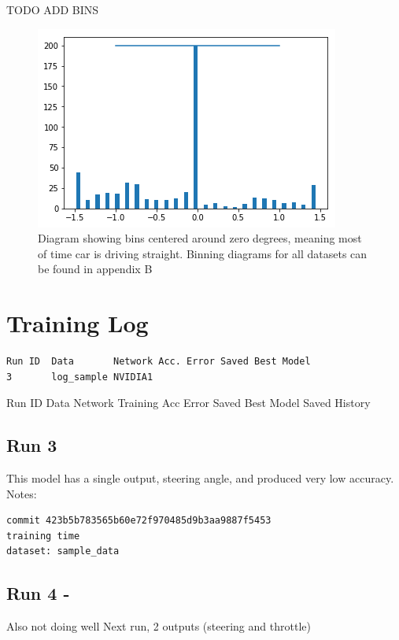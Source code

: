 TODO ADD BINS
\begin{figure}[ht]
 \centering 
 \includegraphics[scale=1]{Figures/bins.png}
 \caption{Diagram showing bins centered around zero degrees, meaning most of time car is driving straight. Binning diagrams for all datasets can be found in appendix B}
 \label{fig:bins-placeholder}
\end{figure}

\section{Training Log}

\begin{verbatim}
Run ID  Data       Network Acc. Error Saved Best Model 
3       log_sample NVIDIA1
\end{verbatim}

Run ID  Data    Network Training    Acc Error   Saved Best Model    Saved History

\subsection{Run 3}

This model has a single output, steering angle, and produced very low accuracy.
Notes:
\begin{verbatim}
commit 423b5b783565b60e72f970485d9b3aa9887f5453
training time
dataset: sample_data
\end{verbatim}

\subsection{Run 4 - }

Also not doing well
Next run, 2 outputs (steering and throttle)

